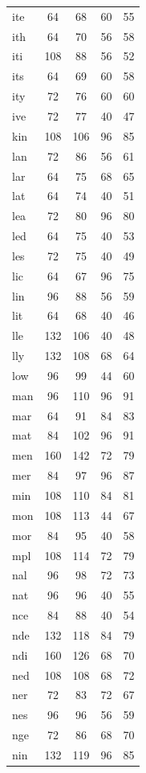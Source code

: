 \documentclass[ms,electronic,twosidetoc,letterpaper,chaptercenter,parttop,lof,lot]{byumsphd}
\begin{document}
\begin{longtable}{| l | c c | c c |}
  ite & 64 & 68 & 60 & 55 \\
  ith & 64 & 70 & 56 & 58 \\
  iti & 108 & 88 & 56 & 52 \\
  its & 64 & 69 & 60 & 58 \\
  ity & 72 & 76 & 60 & 60 \\
  ive & 72 & 77 & 40 & 47 \\
  kin & 108 & 106 & 96 & 85 \\
  lan & 72 & 86 & 56 & 61 \\
  lar & 64 & 75 & 68 & 65 \\
  lat & 64 & 74 & 40 & 51 \\
  lea & 72 & 80 & 96 & 80 \\
  led & 64 & 75 & 40 & 53 \\
  les & 72 & 75 & 40 & 49 \\
  lic & 64 & 67 & 96 & 75 \\
  lin & 96 & 88 & 56 & 59 \\
  lit & 64 & 68 & 40 & 46 \\
  lle & 132 & 106 & 40 & 48 \\
  lly & 132 & 108 & 68 & 64 \\
  low & 96 & 99 & 44 & 60 \\
  man & 96 & 110 & 96 & 91 \\
  mar & 64 & 91 & 84 & 83 \\
  mat & 84 & 102 & 96 & 91 \\
  men & 160 & 142 & 72 & 79 \\
  mer & 84 & 97 & 96 & 87 \\
  min & 108 & 110 & 84 & 81 \\
  mon & 108 & 113 & 44 & 67 \\
  mor & 84 & 95 & 40 & 58 \\
  mpl & 108 & 114 & 72 & 79 \\
  nal & 96 & 98 & 72 & 73 \\
  nat & 96 & 96 & 40 & 55 \\
  nce & 84 & 88 & 40 & 54 \\
  nde & 132 & 118 & 84 & 79 \\
  ndi & 160 & 126 & 68 & 70 \\
  ned & 108 & 108 & 68 & 72 \\
  ner & 72 & 83 & 72 & 67 \\
  nes & 96 & 96 & 56 & 59 \\
  nge & 72 & 86 & 68 & 70 \\
  nin & 132 & 119 & 96 & 85 \\

\end{longtable}
\end{document}

